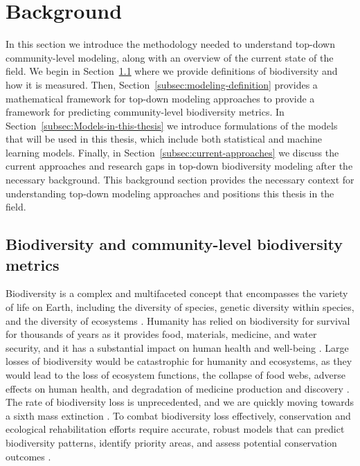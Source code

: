\section{Background}\label{sec:background}
In this section we introduce the methodology needed to understand top-down community-level modeling, along with an overview of the current state of the field. We begin in Section~\ref{subsec:biodiversity} where we provide definitions of biodiversity and how it is measured. Then, Section~\ref{subsec:modeling-definition} provides a mathematical framework for top-down modeling approaches to provide a framework for predicting community-level biodiversity metrics. In Section~\ref{subsec:Models-in-this-thesis} we introduce formulations of the models that will be used in this thesis, which include both statistical and machine learning models. Finally, in Section~\ref{subsec:current-approaches} we discuss the current approaches and research gaps in top-down biodiversity modeling after the necessary background. This background section provides the necessary context for understanding top-down modeling approaches and positions this thesis in the field.
\subsection{Biodiversity and community-level biodiversity metrics}\label{subsec:biodiversity}

Biodiversity is a complex and multifaceted concept that encompasses the variety of life on Earth, including the diversity of species, genetic diversity within species, and the diversity of ecosystems \parencite{Stork2009}. Humanity has relied on biodiversity for survival for thousands of years as it provides food, materials, medicine, and water security, and it has a substantial impact on human health and well-being \parencite{gascon2015,naeem2016, brauman2020, kim2024}. Large losses of biodiversity would be catastrophic for humanity and ecosystems, as they would lead to the loss of ecosystem functions, the collapse of food webs, adverse effects on human health, and degradation of medicine production and discovery \parencite{roe2018}. The rate of biodiversity loss is unprecedented, and we are quickly moving towards a sixth mass extinction \parencite{cowie2022}. To combat biodiversity loss effectively, conservation and ecological rehabilitation efforts require accurate, robust models that can predict biodiversity patterns, identify priority areas, and assess potential conservation outcomes \parencite{sinclair2010, pollock2020}.

